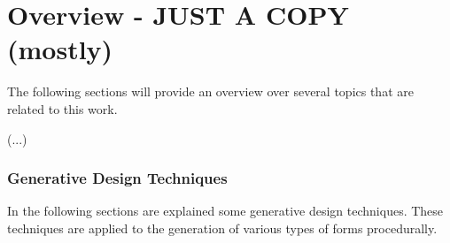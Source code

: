 
\chapter{Overview - JUST A COPY (mostly)} %
\label{cha:overview}

The following sections will provide an overview over several topics that are related to this work. 

(...)





\subsection{Generative Design Techniques} %
\label{sub:procedural_modeling_techniques}

In the following sections are explained some generative design techniques. These techniques are applied to the generation of various types of forms procedurally.













